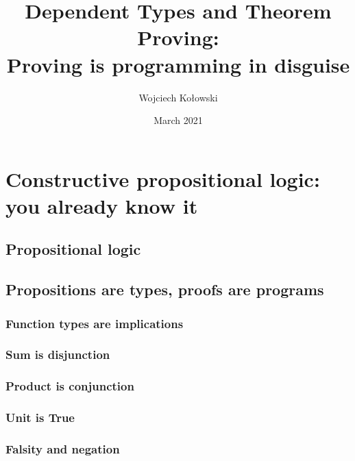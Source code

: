 \documentclass{beamer}
\title{Dependent Types and Theorem Proving: \\Proving is programming in disguise}
\author{Wojciech Kołowski}
\date{March 2021}
\begin{document}
\frame{\titlepage}
\frame{\tableofcontents}

\section{Constructive propositional logic: you already know it}

\subsection{Propositional logic}

\subsection{Propositions are types, proofs are programs}

\subsubsection{Function types are implications}
\subsubsection{Sum is disjunction}
\subsubsection{Product is conjunction}
\subsubsection{Unit is True}

\subsubsection{Falsity and negation}

\end{document}
